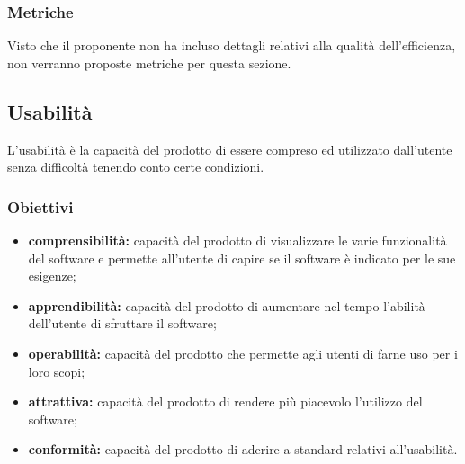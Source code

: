 \subsubsection{Metriche}
Visto che il proponente non ha incluso dettagli relativi alla qualità dell'efficienza, non verranno proposte metriche per questa sezione.

\subsection{Usabilità}
L'usabilità è la capacità del prodotto di essere compreso ed utilizzato dall'utente senza difficoltà tenendo conto certe condizioni.

\subsubsection{Obiettivi}
\begin{itemize}
	\item \textbf{comprensibilità:} capacità del prodotto di visualizzare le varie funzionalità del software e permette all'utente di capire se il software è indicato per le sue esigenze;
	\item \textbf{apprendibilità:} capacità del prodotto di aumentare nel tempo l'abilità dell'utente di sfruttare il software;
	\item \textbf{operabilità:} capacità del prodotto che permette agli utenti di farne uso per i loro scopi;
	\item \textbf{attrattiva:} capacità del prodotto di rendere più piacevolo l'utilizzo del software;
	\item \textbf{conformità:} capacità del prodotto di aderire a standard relativi all'usabilità.
\end{itemize}

